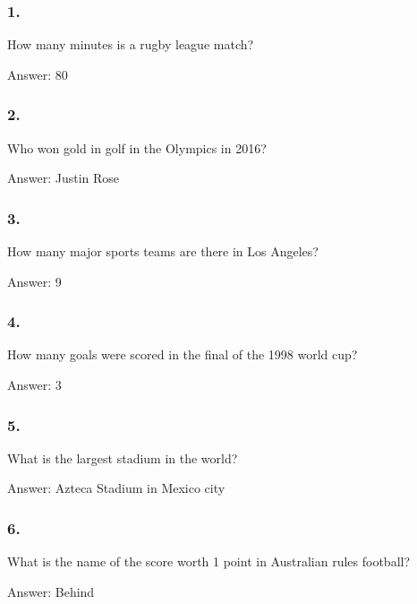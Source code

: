 \documentclass{beamer}
\begin{document}
    \begin{frame}
        \frametitle{1.}
        How many minutes is a rugby league match?\\

        \begin{center}
            Answer: 80
        \end{center}
    \end{frame}

    \begin{frame}
        \frametitle{2.}
        Who won gold in golf in the Olympics in 2016?\\

        \begin{center}
            Answer: Justin Rose
        \end{center}
    \end{frame}

    \begin{frame}
        \frametitle{3.}
        How many major sports teams are there in Los Angeles?\\

        \begin{center}
            Answer: 9
        \end{center}
    \end{frame}

    \begin{frame}
        \frametitle{4.}
        How many goals were scored in the final of the 1998 world cup?\\

        \begin{center}
            Answer: 3
        \end{center}
    \end{frame}

    \begin{frame}
        \frametitle{5.}
        What is the largest stadium in the world?\\

        \begin{center}
            Answer: Azteca Stadium in Mexico city
        \end{center}
    \end{frame}

    \begin{frame}
        \frametitle{6.}
        What is the name of the score worth 1 point in Australian rules
        football?\\

        \begin{center}
            Answer: Behind
        \end{center}
    \end{frame}
\end{document}
